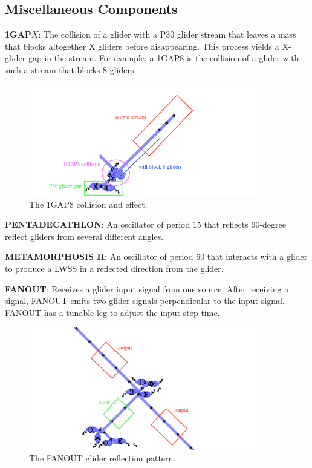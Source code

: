 \documentclass{article}
\begin{document}
\subsection{Miscellaneous Components}
\noindent\textbf{1GAP$X$}: The collision of a glider with a P30 glider stream that leaves a mass that blocks altogether X gliders before disappearing. This process yields a X-glider gap in the stream. For example, a 1GAP8 is the collision of a glider with such a stream that blocks 8 gliders.

\vspace{1em}

\begin{figure}[h]
\centering
\includegraphics[width=10cm,keepaspectratio]{images/1GAP8.png}
\captionsetup{labelformat=empty} \caption{The 1GAP8 collision and effect.}
\end{figure}

\noindent\textbf{PENTADECATHLON}: An oscillator of period 15 that reflects 90-degree reflect gliders from several different angles.

\vspace{1em}

\noindent\textbf{METAMORPHOSIS II}: An oscillator of period 60 that interacts with a glider to produce a LWSS in a reflected direction from the glider.

\vspace{1em}

\noindent\textbf{FANOUT}: Receives a glider input signal from one source. After receiving a signal, FANOUT emits two glider signals perpendicular to the input signal. FANOUT has a tunable leg to adjust the input step-time.

\vspace{1em}

\begin{figure}[h]
\centering
\includegraphics[width=10cm,keepaspectratio]{images/FANOUT.png}
\captionsetup{labelformat=empty} \caption{The FANOUT glider reflection pattern.}
\end{figure}
\end{document}
